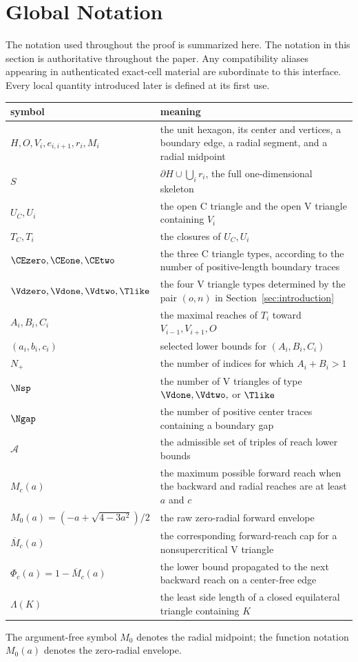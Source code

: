\section{Global Notation}
\label{sec:global-notation}

The notation used throughout the proof is summarized here.
The notation in this section is authoritative throughout the paper.  Any compatibility aliases appearing in authenticated exact-cell material are subordinate to this interface.
  Every local
quantity introduced later is defined at its first use.

\small
\renewcommand{\arraystretch}{1.08}
\begin{longtable}{@{}p{}p{}@{}}
\toprule
symbol&meaning\\
\midrule
$H,O,V_i,e_{i,i+1},r_i,M_i$&
the unit hexagon, its center and vertices, a boundary edge, a radial segment,
and a radial midpoint\\
$S$&$\partial H\cup\bigcup_i r_i$, the full one-dimensional skeleton\\
$U_C,U_i$&the open C triangle and the open V triangle containing
$V_i$\\
$T_C,T_i$&the closures of $U_C,U_i$\\
$\CEzero,\CEone,\CEtwo$&the three C triangle types, according to the
number of positive-length boundary traces\\
$\Vdzero,\Vdone,\Vdtwo,\Tlike$&the four V triangle types determined by
the pair $(o,n)$ in Section~\ref{sec:introduction}\\
$A_i,B_i,C_i$&the maximal reaches of $T_i$ toward $V_{i-1},V_{i+1},O$\\
$(a_i,b_i,c_i)$&selected lower bounds for $(A_i,B_i,C_i)$\\
$N_+$&the number of indices for which $A_i+B_i>1$\\
$\Nsp$&the number of V triangles of type $\Vdone,\Vdtwo,$ or $\Tlike$\\
$\Ngap$&the number of positive center traces containing a boundary gap\\
$\mathcal A$&the admissible set of triples of reach lower bounds\\
$M_c(a)$&the maximum possible forward reach when the backward and radial
reaches are at least $a$ and $c$\\
$M_0(a)=(-a+\sqrt{4-3a^2})/2$&the raw zero-radial forward envelope\\
$\overline M_c(a)$&the corresponding forward-reach cap for a
nonsupercritical V triangle\\
$\Phi_c(a)=1-\overline M_c(a)$&the lower bound propagated to the next
backward reach on a center-free edge\\
$\Lambda(K)$&the least side length of a closed equilateral triangle containing
$K$\\
\bottomrule
\end{longtable}
\normalsize
The argument-free symbol $M_0$ denotes the radial midpoint; the function
notation $M_0(a)$ denotes the zero-radial envelope.
